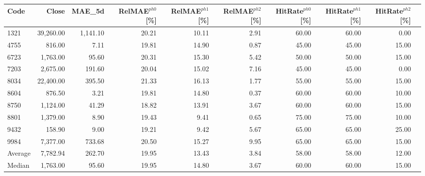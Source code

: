 \begingroup
\footnotesize
\begin{tabular}{lrrrrrrrrr}
\hline
Code & Close & MAE\_5d & RelMAE$^{ph0}$[\%] & RelMAE$^{ph1}$[\%] & RelMAE$^{ph2}$[\%] & HitRate$^{ph0}$[\%] & HitRate$^{ph1}$[\%] & HitRate$^{ph2}$[\%] \\
\hline
1321 & 39,260.00 & 1,141.10 & 20.21 & 10.11 & 2.91 & 60.00 & 60.00 & 0.00 \\
4755 & 816.00 & 7.11 & 19.81 & 14.90 & 0.87 & 45.00 & 45.00 & 15.00 \\
6723 & 1,763.00 & 95.60 & 20.31 & 15.30 & 5.42 & 50.00 & 50.00 & 15.00 \\
7203 & 2,675.00 & 191.60 & 20.04 & 15.02 & 7.16 & 45.00 & 45.00 & 0.00 \\
8034 & 22,400.00 & 395.50 & 21.33 & 16.13 & 1.77 & 55.00 & 55.00 & 15.00 \\
8604 & 876.50 & 3.21 & 19.81 & 14.80 & 0.37 & 60.00 & 60.00 & 10.00 \\
8750 & 1,124.00 & 41.29 & 18.82 & 13.91 & 3.67 & 60.00 & 60.00 & 15.00 \\
8801 & 1,379.00 & 8.90 & 19.43 & 9.41 & 0.65 & 75.00 & 75.00 & 10.00 \\
9432 & 158.90 & 9.00 & 19.21 & 9.42 & 5.67 & 65.00 & 65.00 & 25.00 \\
9984 & 7,377.00 & 733.68 & 20.50 & 15.27 & 9.95 & 65.00 & 65.00 & 15.00 \\
Average & 7,782.94 & 262.70 & 19.95 & 13.43 & 3.84 & 58.00 & 58.00 & 12.00 \\
Median & 1,763.00 & 95.60 & 19.95 & 14.80 & 3.67 & 60.00 & 60.00 & 15.00 \\
\hline
\end{tabular}
\endgroup